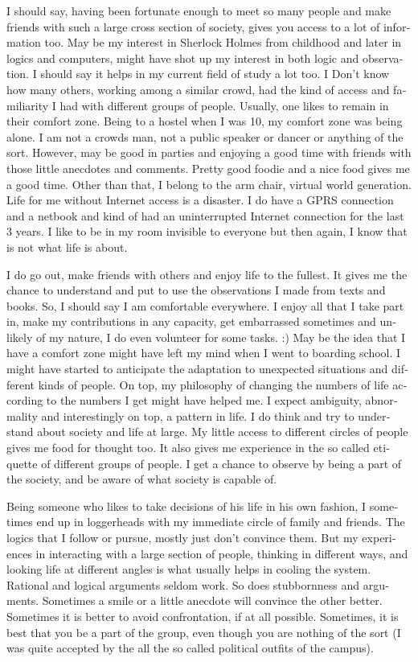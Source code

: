 \begin{english}
I should say, having been fortunate enough to meet so many people and make friends with such a 
large cross section of society, gives you access to a lot of information too. May be my interest
in Sherlock Holmes from childhood and later in logics and computers, might have shot up my interest 
in both logic and observation. I should say it helps in my current field of study a lot too. I Don't 
know how many others, working among a similar crowd, had the kind of access and familiarity I had with
different groups of people. Usually, one likes to remain in their comfort zone. Being to a hostel 
when I was 10, my comfort zone was being alone. I am not a crowds man, not a public speaker or dancer 
or anything of the sort. However, may be good in parties and enjoying a good time with friends with those little anecdotes
and comments. Pretty good foodie and a nice food gives me a good time. Other than that, I belong to 
the arm chair, virtual world generation. Life for me without Internet access is a disaster. I do have
a GPRS connection and a netbook and kind of had an uninterrupted Internet connection for the last 3 years. I like to 
be in my room invisible to everyone but then again, I know that is not what life is about. 

I do go out, make friends with others and enjoy life to the fullest. It gives me the chance to understand 
and put to use the observations I made from texts and books. So, I should say I am comfortable
everywhere. I enjoy all that I take part in, make my contributions in any capacity, get embarrassed
sometimes and unlikely of my nature, I do even volunteer for some tasks. :) May be the idea that I
have a comfort zone might have left my mind when I went to boarding school. I might have started to anticipate the adaptation to 
unexpected situations and different kinds of people. On top, 
my philosophy of changing the numbers of life according to the numbers I get might have helped me. I 
expect ambiguity, abnormality and interestingly on top, a pattern in life. I do think and try to
understand about society and life at large. My little access to different circles of people gives 
me food for thought too. It also gives me experience in the so called etiquette of different 
groups of people. I get a chance to observe by being a part of the society, and be aware of what society 
is capable of. 

Being someone who likes to take decisions of his life in his own fashion, I sometimes end up in
loggerheads with my immediate circle of family and friends. The logics that I follow or pursue, mostly 
just don't convince them. But my experiences in interacting with a large section of people, thinking 
in different ways, and looking life at different angles is what usually helps in cooling the system.
Rational and logical arguments seldom work. So does stubbornness and arguments. Sometimes a smile or 
a little anecdote will convince the other better. Sometimes it is better to avoid confrontation, if at 
all possible. Sometimes, it is best that you be a part of the group, even though you are nothing of the 
sort (I was quite accepted by the all the so called political outfits of the campus). 


\end{english}
